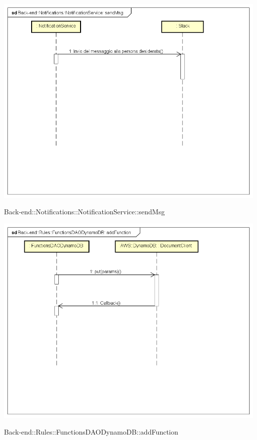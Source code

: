 \includegraphics[width=\textwidth,height=\textheight,keepaspectratio]{images/diagrams/back-end/Ufficial_Backend/Back-end__Notifications__NotificationService__sendMsg.png} 	\caption{Back-end::Notifications::NotificationService::sendMsg}
\includegraphics[width=\textwidth,height=\textheight,keepaspectratio]{images/diagrams/back-end/Ufficial_Backend/Back-end__Rules__FunctionsDAODynamoDB__addFunction.png} 	\caption{Back-end::Rules::FunctionsDAODynamoDB::addFunction}
